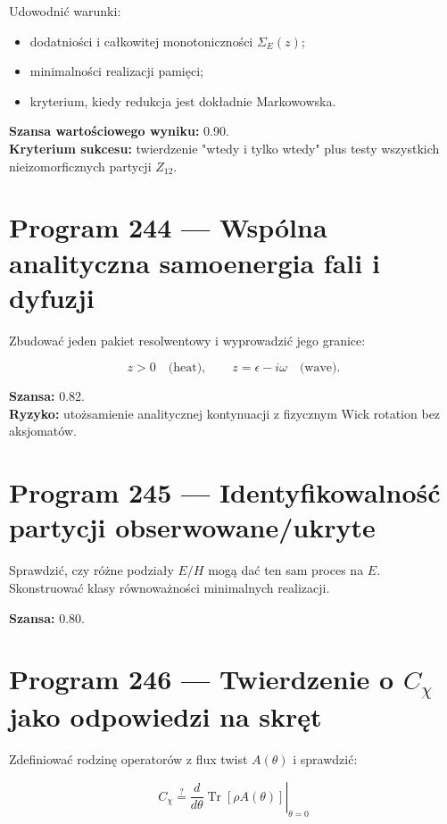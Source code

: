 \documentclass[11pt,a4paper,openany]{report}
\begin{document}
Udowodnić warunki:

\begin{itemize}
\item 
dodatniości i całkowitej monotoniczności \(\Sigma_E(z)\);

\item 
minimalności realizacji pamięci;

\item 
kryterium, kiedy redukcja jest dokładnie Markowowska.

\end{itemize}

\textbf{Szansa wartościowego wyniku:} 0.90.\\
\textbf{Kryterium sukcesu:} twierdzenie "wtedy i tylko wtedy" plus testy wszystkich nieizomorficznych partycji \(Z_{12}\).

\section{Program 244 --- Wspólna analityczna samoenergia fali i dyfuzji}

Zbudować jeden pakiet resolwentowy i wyprowadzić jego granice:

\[
z>0\quad\text{(heat)},\qquad z=\epsilon-i\omega\quad\text{(wave)}.
\]

\textbf{Szansa:} 0.82.\\
\textbf{Ryzyko:} uto\.zsamienie analitycznej kontynuacji z fizycznym Wick rotation bez aksjomatów.

\section{Program 245 --- Identyfikowalność partycji obserwowane/\allowbreak{}ukryte}

Sprawdzić, czy ró\.zne podziały \(E/H\) mogą dać ten sam proces na \(E\). Skonstruować klasy równowa\.zności minimalnych realizacji.

\textbf{Szansa:} 0.80.

\section{\texorpdfstring{Program 246 --- Twierdzenie o \(C_\chi\) jako odpowiedzi na skręt}{Program 246 --- Twierdzenie o C\_ jako odpowiedzi na skręt}}

Zdefiniować rodzinę operatorów z flux twist \(A(\theta)\) i sprawdzić:

\[
C_\chi\stackrel{?}{=}
\left.\frac{d}{d\theta}
\operatorname{Tr}[\rho A(\theta)]
\right|_{\theta=0}
\]
\end{document}
